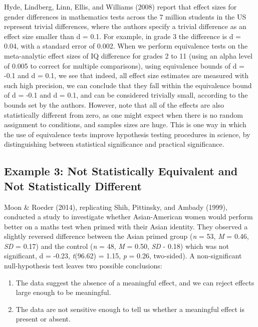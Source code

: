 \documentclass[english,man]{apa6}
\providecommand{\tightlist}{%
  \setlength{\itemsep}{0pt}\setlength{\parskip}{0pt}}
\newcounter{author}
\theoremstyle{definition}
\theoremstyle{definition}
\theoremstyle{definition}
\theoremstyle{remark}
\begin{document}
Hyde, Lindberg, Linn, Ellis, and Williams (2008) report that effect
sizes for gender differences in mathematics tests across the 7 million
students in the US represent trivial differences, where the authors
specify a trivial difference as an effect size smaller than d = 0.1. For
example, in grade 3 the difference is d = 0.04, with a standard error of
0.002. When we perform equivalence tests on the meta-analytic effect
sizes of IQ difference for grades 2 to 11 (using an alpha level of 0.005
to correct for multiple comparisons), using equivalence bounds of d =
-0.1 and d = 0.1, we see that indeed, all effect size estimates are
measured with such high precision, we can conclude that they fall within
the equivalence bound of d = -0.1 and d = 0.1, and can be considered
trivially small, according to the bounds set by the authors. However,
note that all of the effects are also statistically different from zero,
as one might expect when there is no random assignment to conditions,
and samples sizes are huge. This is one way in which the use of
equivalence tests improve hypothesis testing procedures in science, by
distinguishing between statistical significance and practical
significance.

\subsection{Example 3: Not Statistically Equivalent and Not
Statistically
Different}\label{example-3-not-statistically-equivalent-and-not-statistically-different}

Moon \& Roeder (2014), replicating Shih, Pittinsky, and Ambady (1999),
conducted a study to investigate whether Asian-American women would
perform better on a maths test when primed with their Asian identity.
They observed a slightly reversed difference between the Asian primed
group (\emph{n} = 53, \emph{M} = 0.46, \emph{SD} = 0.17) and the control
(\emph{n} = 48, \emph{M} = 0.50, \emph{SD} - 0.18) which was not
significant, d = -0.23, \emph{t}(96.62) = 1.15, \emph{p} = 0.26,
two-sided). A non-significant null-hypothesis test leaves two possible
conclusions:

\begin{enumerate}
\def\labelenumi{\arabic{enumi}.}
\tightlist
\item
  The data suggest the absence of a meaningful effect, and we can reject
  effects large enough to be meaningful.
\item
  The data are not sensitive enough to tell us whether a meaningful
  effect is present or absent.
\end{enumerate}
\end{document}
